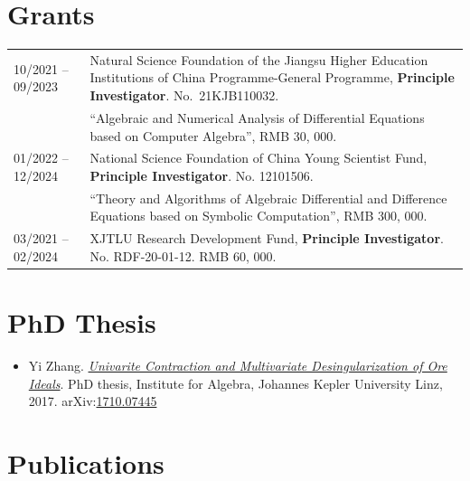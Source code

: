 \documentclass[a4paper,12pt]{article}
\begin{document}
\section*{\Large{Grants}}
\begin{longtable}{@{}p{1.4in}p{4in}}
10/2021 -- 09/2023 & Natural Science Foundation of the Jiangsu Higher Education Institutions of China Programme-General Programme, 
                                       \textbf{Principle Investigator}. No.\ 21KJB110032. \\
                                   & ``Algebraic and Numerical Analysis of Differential Equations based on Computer Algebra'', RMB 30, 000. \\     
01/2022 -- 12/2024 & National Science Foundation of China Young Scientist Fund, \textbf{Principle Investigator}. No. 12101506. \\
                                 & ``Theory and Algorithms of Algebraic Differential and Difference Equations based on Symbolic Computation'',
                                 RMB 300, 000. \\
03/2021 -- 02/2024    & XJTLU Research Development Fund, \textbf{Principle Investigator}. No. RDF-20-01-12. RMB 60, 000.

\end{longtable}

\section*{\Large{PhD Thesis}}
\begin{itemize}
 \item Yi Zhang. \href{https://yzhang1616.github.io/yzhang_PhDthesis_final.pdf}{{\em Univarite 
                Contraction and Multivariate Desingularization of Ore Ideals}}. 
                PhD thesis, Institute for Algebra, Johannes Kepler University Linz, 2017. 
                arXiv:\href{https://arxiv.org/abs/1710.07445}{1710.07445}
\end{itemize}

\section*{\Large{Publications}}
\end{document}
